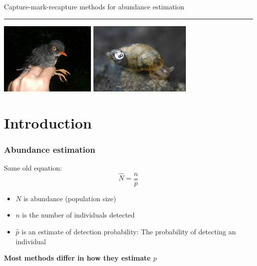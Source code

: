 \documentclass[color=usenames,dvipsnames]{beamer}\usepackage[]{graphicx}\usepackage[]{color}
\begin{document}

\begin{frame}[plain]
  \begin{center}
    {\huge Capture-mark-recapture methods for abundance estimation \par}
    \vspace{0.5cm}
    {\color{RoyalBlue} \rule{\textwidth}{1pt}}
    \vfill
    \includegraphics[height=3.5cm,keepaspectratio]{figs/SBNT} %
    \hspace{0.5cm}
      \includegraphics[height=3.5cm,keepaspectratio]{figs/Novisuccinea_chittenangoensis_4}
  \end{center}
\end{frame}




\section{Introduction}


\begin{frame}
  \frametitle{Abundance estimation}
  \large
  Same old equation:
  \[
    \hat{N} = \frac{n}{\hat{p}}
  \]
  \begin{itemize}
    \item $N$ is abundance (population size)
    \item $n$ is the number of individuals detected
    \item $\hat{p}$ is an estimate of detection probability: The probability
      of detecting an individual
  \end{itemize}
  \pause
  \vfill
  \Large \bf
  Most methods differ in how they estimate $p$
\end{frame}
\end{document}
